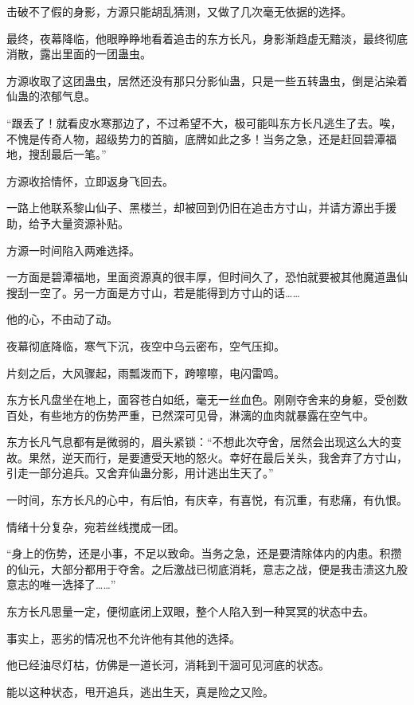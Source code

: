 
\begin{this_body}

击破不了假的身影，方源只能胡乱猜测，又做了几次毫无依据的选择。

最终，夜幕降临，他眼睁睁地看着追击的东方长凡，身影渐趋虚无黯淡，最终彻底消散，露出里面的一团蛊虫。

方源收取了这团蛊虫，居然还没有那只分影仙蛊，只是一些五转蛊虫，倒是沾染着仙蛊的浓郁气息。

“跟丢了！就看皮水寒那边了，不过希望不大，极可能叫东方长凡逃生了去。唉，不愧是传奇人物，超级势力的首脑，底牌如此之多！当务之急，还是赶回碧潭福地，搜刮最后一笔。”

方源收拾情怀，立即返身飞回去。

一路上他联系黎山仙子、黑楼兰，却被回到仍旧在追击方寸山，并请方源出手援助，给予大量资源补贴。

方源一时间陷入两难选择。

一方面是碧潭福地，里面资源真的很丰厚，但时间久了，恐怕就要被其他魔道蛊仙搜刮一空了。另一方面是方寸山，若是能得到方寸山的话……

他的心，不由动了动。

夜幕彻底降临，寒气下沉，夜空中乌云密布，空气压抑。

片刻之后，大风骤起，雨瓢泼而下，跨嚓嚓，电闪雷鸣。

东方长凡盘坐在地上，面容苍白如纸，毫无一丝血色。刚刚夺舍来的身躯，受创数百处，有些地方的伤势严重，已然深可见骨，淋漓的血肉就暴露在空气中。

东方长凡气息都有是微弱的，眉头紧锁：“不想此次夺舍，居然会出现这么大的变故。果然，逆天而行，是要遭受天地的怒火。幸好在最后关头，我舍弃了方寸山，引走一部分追兵。又舍弃仙蛊分影，用计逃出生天了。”

一时间，东方长凡的心中，有后怕，有庆幸，有喜悦，有沉重，有悲痛，有仇恨。

情绪十分复杂，宛若丝线搅成一团。

“身上的伤势，还是小事，不足以致命。当务之急，还是要清除体内的内患。积攒的仙元，大部分都用于夺舍。之后激战已彻底消耗，意志之战，便是我击溃这九股意志的唯一选择了……”

东方长凡思量一定，便彻底闭上双眼，整个人陷入到一种冥冥的状态中去。

事实上，恶劣的情况也不允许他有其他的选择。

他已经油尽灯枯，仿佛是一道长河，消耗到干涸可见河底的状态。

能以这种状态，甩开追兵，逃出生天，真是险之又险。


\end{this_body}
